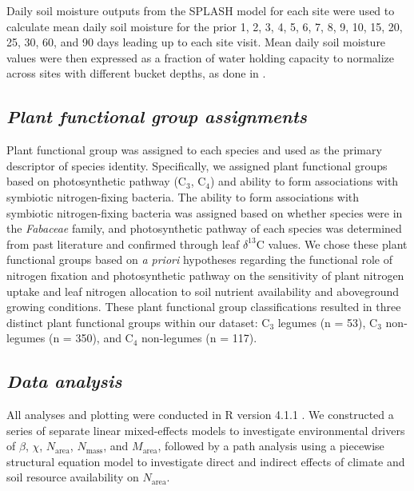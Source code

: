 Daily soil moisture outputs from the SPLASH model for each site were used to calculate mean daily soil moisture for the prior 1, 2, 3, 4, 5, 6, 7, 8, 9, 10, 15, 20, 25, 30, 60, and 90 days leading up to each site visit. Mean daily soil moisture values were then expressed as a fraction of water holding capacity to normalize across sites with different bucket depths, as done in .

\subsection{\textit{Plant functional group assignments}}
Plant functional group was assigned to each species and used as the primary descriptor of species identity. Specifically, we assigned plant functional groups based on photosynthetic pathway (C$_3$, C$_4$) and ability to form associations with symbiotic nitrogen-fixing bacteria. The ability to form associations with symbiotic nitrogen-fixing bacteria was assigned based on whether species were in the \textit{Fabaceae} family, and photosynthetic pathway of each species was determined from past literature and confirmed through leaf $\delta^{13}$C values. We chose these plant functional groups based on \textit{a priori} hypotheses regarding the functional role of nitrogen fixation and photosynthetic pathway on the sensitivity of plant nitrogen uptake and leaf nitrogen allocation to soil nutrient availability and aboveground growing conditions. These plant functional group classifications resulted in three distinct plant functional groups within our dataset: C$_3$ legumes (n = 53), C$_3$ non-legumes (n = 350), and C$_4$ non-legumes (n = 117).

\subsection{\textit{Data analysis}}
All analyses and plotting were conducted in R version 4.1.1 . We constructed a series of separate linear mixed-effects models to investigate environmental drivers of $\beta$, $\chi$, $N_\mathrm{area}$, $N_\mathrm{mass}$, and $M_\mathrm{area}$, followed by a path analysis using a piecewise structural equation model to investigate direct and indirect effects of climate and soil resource availability on $N_\mathrm{area}$.

